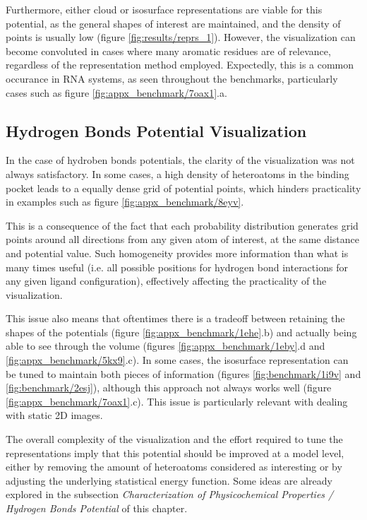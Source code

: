     Furthermore, either cloud or isosurface representations are viable for this potential, as the general shapes of interest are maintained, and the density of points is usually low (figure \ref{fig:results/reprs_1}). However, the visualization can become convoluted in cases where many aromatic residues are of relevance, regardless of the representation method employed. Expectedly, this is a common occurance in RNA systems, as seen throughout the benchmarks, particularly cases such as figure \ref{fig:appx_benchmark/7oax1}.a.

  \subsection{Hydrogen Bonds Potential Visualization}
    In the case of hydroben bonds potentials, the clarity of the visualization was not always satisfactory. In some cases, a high density of heteroatoms in the binding pocket leads to a equally dense grid of potential points, which hinders practicality in examples such as figure \ref{fig:appx_benchmark/8eyv}.

    This is a consequence of the fact that each probability distribution generates grid points around all directions from any given atom of interest, at the same distance and potential value. Such homogeneity provides more information than what is many times useful (i.e. all possible positions for hydrogen bond interactions for any given ligand configuration), effectively affecting the practicality of the visualization.

    This issue also means that oftentimes there is a tradeoff between retaining the shapes of the potentials (figure \ref{fig:appx_benchmark/1ehe}.b) and actually being able to see through the volume (figures \ref{fig:appx_benchmark/1eby}.d and \ref{fig:appx_benchmark/5kx9}.c). In some cases, the isosurface representation can be tuned to maintain both pieces of information (figures \ref{fig:benchmark/1i9v} and \ref{fig:benchmark/2esj}), although this approach not always works well (figure \ref{fig:appx_benchmark/7oax1}.c). This issue is particularly relevant with dealing with static 2D images.

    The overall complexity of the visualization and the effort required to tune the representations imply that this potential should be improved at a model level, either by removing the amount of heteroatoms considered as interesting or by adjusting the underlying statistical energy function. Some ideas are already explored in the subsection \textit{Characterization of Physicochemical Properties / Hydrogen Bonds Potential} of this chapter.

